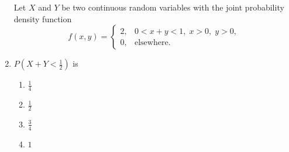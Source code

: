 \documentclass[journal,12pt,onecolumn]{IEEEtran}
\theoremstyle{remark}
\begin{document}
\begin{enumerate}
    	Let $X$ and $Y$ be two continuous random variables with the joint probability density function
    	$$ f(x, y) = \begin{cases} 
    		2, & 0 < x + y < 1, \; x > 0, \; y > 0, \\
    		0, & \text{elsewhere}.
    	\end{cases} $$
    	\item $P\left(X + Y < \frac{1}{2}\right)$ is
    	\begin{multicols}{4}
    	\begin{enumerate}
    		\item $\frac{1}{4}$
    		\item $\frac{1}{2}$
    		\item $\frac{3}{4}$
    		\item $1$
    	\end{enumerate}
    	\end{multicols}
    	

\end{enumerate}
\end{document}
